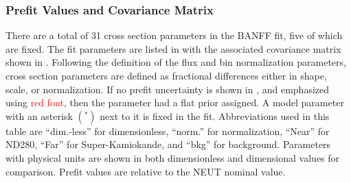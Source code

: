\subsubsection{Prefit Values and Covariance Matrix}

There are a total of 31 cross section parameters in the BANFF fit,
five of which are fixed. The fit parameters are listed in 
with the associated covariance matrix shown in .
Following the definition of the flux and bin normalization parameters,
cross section parameters are defined as fractional differences either
in shape, scale, or normalization. If no prefit uncertainty is shown
in , and emphasized using \textcolor{red}{red
font}, then the parameter had a flat prior assigned. A model parameter
with an asterisk $\left(^{*}\right)$ next to it is fixed in the fit.
Abbreviations used in this table are ``dim.-less'' for dimensionless,
``norm.'' for normalization, ``Near'' for ND280, ``Far'' for
Super-Kamiokande, and ``bkg'' for background. Parameters with physical
units are shown in both dimensionless and dimensional values for comparison.
Prefit values are relative to the NEUT nominal value.

